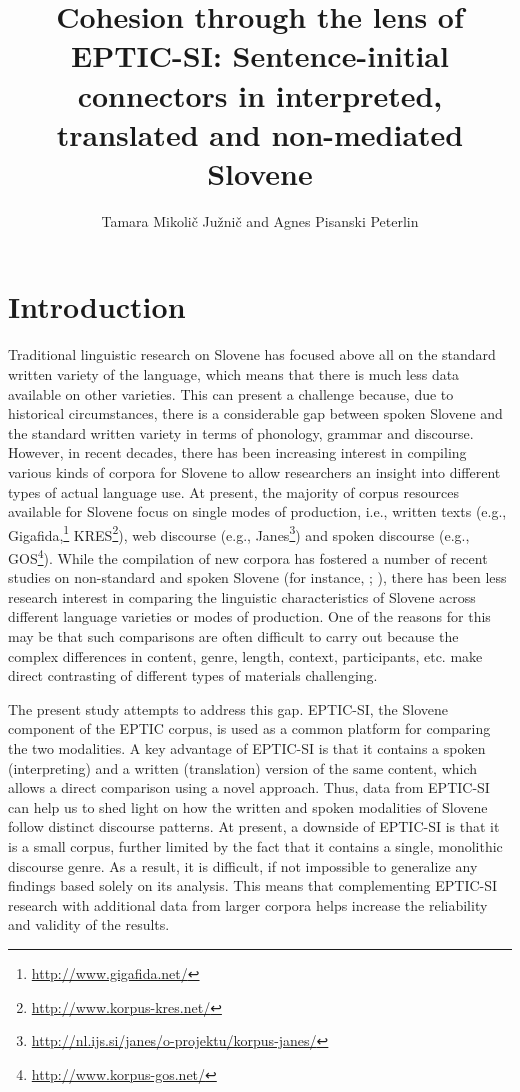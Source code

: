 \documentclass[output=paper]{langscibook}
\author{Tamara Mikolič Južnič\orcid{}\affiliation{University of Ljubljana} and Agnes Pisanski Peterlin\orcid{}\affiliation{University of Ljubljana}}
\title[Cohesion through the lens of EPTIC-SI]{Cohesion through the lens of EPTIC-SI: Sentence-initial connectors in interpreted, translated and non-mediated Slovene}
\begin{document}
\maketitle



\section{Introduction}

Traditional linguistic research on Slovene has focused above all on the standard written variety of the language, which means that there is much less data available on other varieties. This can present a challenge because, due to historical circumstances, there is a considerable gap between spoken Slovene and the standard written variety in terms of phonology, grammar and discourse. However, in recent decades, there has been increasing interest in compiling various kinds of corpora for Slovene to allow researchers an insight into different types of actual language use. At present, the majority of corpus resources available for Slovene focus on single modes of production, i.e., written texts (e.g., Gigafida,\footnote{\url{http://www.gigafida.net/}} KRES\footnote{\url{http://www.korpus-kres.net/}}), web discourse (e.g., Janes\footnote{\url{http://nl.ijs.si/janes/o-projektu/korpus-janes/}}) and spoken discourse (e.g., GOS\footnote{\url{http://www.korpus-gos.net/}}). While the compilation of new corpora has fostered a number of recent studies on non-standard and spoken Slovene (for instance, \citealt{FiserEtAl2020}; \citealt{Verdonik2015}), there has been less research interest in comparing the linguistic characteristics of Slovene across different language varieties or modes of production. One of the reasons for this may be that such comparisons are often difficult to carry out because the complex differences in content, genre, length, context, participants, etc. make direct contrasting of different types of materials challenging.

The present study attempts to address this gap. EPTIC-SI, the Slovene component of the EPTIC corpus, is used as a common platform for comparing the two modalities. A key advantage of EPTIC-SI is that it contains a spoken (interpreting) and a written (translation) version of the same content, which allows a direct comparison using a novel approach. Thus, data from EPTIC-SI can help us to shed light on how the written and spoken modalities of Slovene follow distinct discourse patterns. At present, a downside of EPTIC-SI is that it is a small corpus, further limited by the fact that it contains a single, monolithic discourse genre. As a result, it is difficult, if not impossible to generalize any findings based solely on its analysis. This means that complementing EPTIC-SI research with additional data from larger corpora helps increase the reliability and validity of the results.
\end{document}
